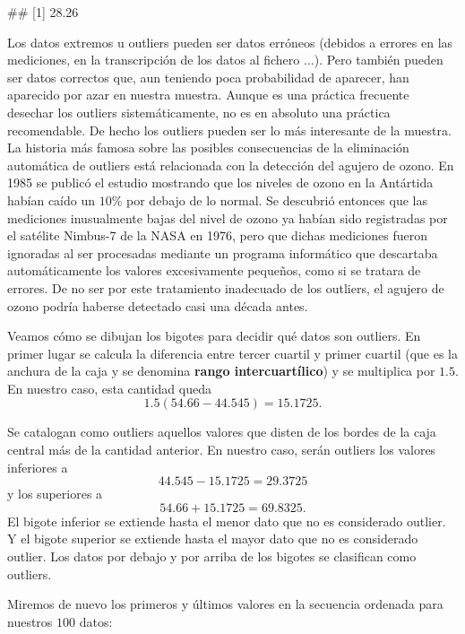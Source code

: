 \documentclass[
  title=normal,
  notoc,
  nobib,
  degree=mecinf]{mnye}
\newenvironment{Shaded}{\begin{snugshade}}{\end{snugshade}}
\newcommand{\NormalTok}[1]{#1}
\begin{document}
\begin{Shaded}
\begin{Highlighting}[]
\NormalTok{\#\# [1] 28.26}
\end{Highlighting}
\end{Shaded}

Los datos extremos u outliers pueden ser datos erróneos (debidos a errores en las mediciones, en la transcripción de los datos al fichero \(\dotsc\)). Pero también pueden ser datos correctos que, aun teniendo poca probabilidad de aparecer, han aparecido por azar en nuestra muestra. Aunque es una práctica frecuente desechar los outliers sistemáticamente, no es en absoluto una práctica recomendable. De hecho los outliers pueden ser lo más interesante de la muestra. La historia más famosa sobre las posibles consecuencias de la eliminación automática de outliers está relacionada con la detección del agujero de ozono. En 1985 se publicó el estudio mostrando que los niveles de ozono en la Antártida habían caído un \(10\%\) por debajo de lo normal. Se descubrió entonces que las mediciones inusualmente bajas del nivel de ozono ya habían sido registradas por el satélite Nimbus-7 de la NASA en 1976, pero que dichas mediciones fueron ignoradas al ser procesadas mediante un programa informático que descartaba automáticamente los valores excesivamente pequeños, como si se tratara de errores. De no ser por este tratamiento inadecuado de los outliers, el agujero de ozono podría haberse detectado casi una década antes.

Veamos cómo se dibujan los bigotes para decidir qué datos son outliers.
En primer lugar se calcula la diferencia entre tercer cuartil y primer cuartil (que es la anchura de la caja y se denomina \textbf{rango intercuartílico}) y se multiplica por \(1.5\). En nuestro caso, esta cantidad queda
\[
    1.5(54.66-44.545)=15.1725.
\]

Se catalogan como outliers aquellos valores que disten de los bordes de la caja central más de la cantidad anterior. En nuestro caso, serán outliers los valores inferiores a
\[
    44.545-15.1725=29.3725
\]
y los superiores a
\[
    54.66+15.1725=69.8325.
\]
El bigote inferior se extiende hasta el menor dato que no es considerado outlier. Y el bigote superior se extiende hasta el mayor dato que no es considerado outlier. Los datos por debajo y por arriba de los bigotes se clasifican como outliers.

Miremos de nuevo los primeros y últimos valores en la secuencia ordenada para nuestros \(100\) datos:
\end{document}
